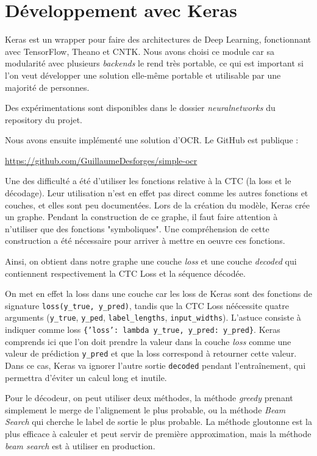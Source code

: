 \documentclass{report}
\begin{document}
\section{Développement avec Keras}

Keras est un wrapper pour faire des architectures de Deep Learning, fonctionnant avec TensorFlow, Theano et CNTK.
Nous avons choisi ce module car sa modularité avec plusieurs \textit{backends} le rend très portable, ce qui est important si l'on veut développer une solution elle-même portable et utilisable par une majorité de personnes.

Des expérimentations sont disponibles dans le dossier \textit{neuralnetworks} du repository du projet.

Nous avons ensuite implémenté une solution d'OCR. Le GitHub est publique :

\url{https://github.com/GuillaumeDesforges/simple-ocr}

Une des difficulté a été d'utiliser les fonctions relative à la CTC (la loss et le décodage).
Leur utilisation n'est en effet pas direct comme les autres fonctions et couches, et elles sont peu documentées.
Lors de la création du modèle, Keras crée un graphe.
Pendant la construction de ce graphe, il faut faire attention à n'utiliser que des fonctions "symboliques".
Une compréhension de cette construction a été nécessaire pour arriver à mettre en oeuvre ces fonctions.

Ainsi, on obtient dans notre graphe une couche \textit{loss} et une couche \textit{decoded} qui contiennent respectivement la CTC Loss et la séquence décodée.

On met en effet la loss dans une couche car les loss de Keras sont des fonctions de signature \texttt{loss(y\_true, y\_pred)}, tandis que la CTC Loss néécessite quatre arguments (\texttt{y\_true}, \texttt{y\_ped}, \texttt{label\_lengths}, \texttt{input\_widths}).
L'astuce consiste à indiquer comme loss \texttt{\{'loss': lambda y\_true, y\_pred: y\_pred\}}.
Keras comprends ici que l'on doit prendre la valeur dans la couche \textit{loss} comme une valeur de prédiction \texttt{y\_pred} et que la loss correspond à retourner cette valeur.
Dans ce cas, Keras va ignorer l'autre sortie \texttt{decoded} pendant l'entraînement, qui permettra d'éviter un calcul long et inutile.

Pour le décodeur, on peut utiliser deux méthodes, la méthode \textit{greedy} prenant simplement le merge de l'alignement le plus probable, ou la méthode \textit{Beam Search} qui cherche le label de sortie le plus probable.
La méthode gloutonne est la plus efficace à calculer et peut servir de première approximation, mais la méthode \textit{beam search} est à utiliser en production.
\end{document}
